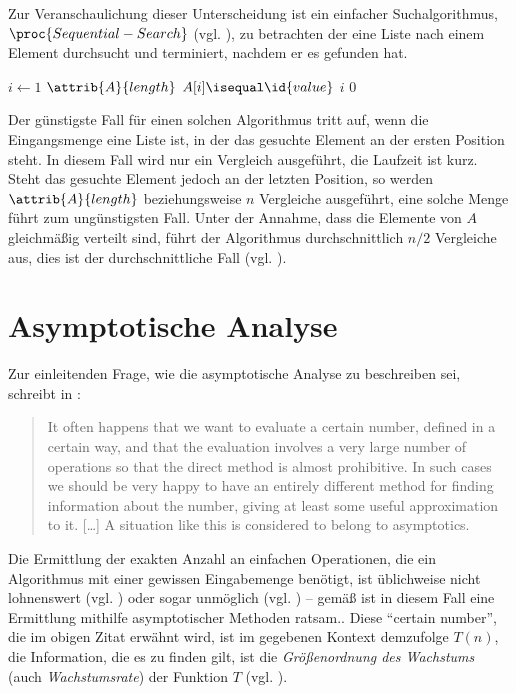 Zur Veranschaulichung dieser Unterscheidung ist ein einfacher Suchalgorithmus, $\proc{Sequential-Search}$ (vgl. \cite[396]{taocp3}), zu betrachten der eine Liste nach einem Element durchsucht und terminiert, nachdem er es gefunden hat.

\begin{codebox}
    \li \For $i \gets 1$ \To $\attrib{A}{length}$
    \li     \Do
                \If $A[i] \isequal \id{value}$
    \li             \Then
                        \Return $i$
                    \End
            \End
    \li \Return $0$
\end{codebox}

Der günstigste Fall für einen solchen Algorithmus tritt auf, wenn die Eingangsmenge eine Liste ist, in der das gesuchte Element an der ersten Position steht. In diesem Fall wird nur ein Vergleich ausgeführt, die Laufzeit ist kurz. Steht das gesuchte Element jedoch an der letzten Position, so werden $\attrib{A}{length}$ beziehungsweise $n$ Vergleiche ausgeführt, eine solche Menge führt zum ungünstigsten Fall. Unter der Annahme, dass die Elemente von $A$ gleichmäßig verteilt sind, führt der Algorithmus durchschnittlich $n/2$ Vergleiche aus, dies ist der durchschnittliche Fall (vgl. \cite[59]{sha2011}).

\section{Asymptotische Analyse}
\label{sec:asymptotic-analysis}

Zur einleitenden Frage, wie die asymptotische Analyse zu beschreiben sei, schreibt \citeauthor{bru1958} in :

\blockquote[{\cite[1]{bru1958}}]{It often happens that we want to evaluate a certain number, defined in a certain way, and that the evaluation involves a very large number of operations so that the direct method is almost prohibitive. In such cases we should be very happy to have an entirely different method for finding information about the number, giving at least some useful approximation to it. [\ldots] A situation like this is considered to belong to asymptotics.}

Die Ermittlung der exakten Anzahl an einfachen Operationen, die ein Algorithmus mit einer gewissen Eingabemenge benötigt, ist üblichweise nicht lohnenswert (vgl. \cite[28]{hsr1997}) oder sogar unmöglich (vgl. \cite[37]{meh1984}) -- gemäß \citeauthor{bru1958} ist in diesem Fall eine Ermittlung mithilfe asymptotischer Methoden ratsam.. Diese \enquote{certain number}, die im obigen Zitat erwähnt wird, ist im gegebenen Kontext demzufolge $T(n)$, die Information, die es zu finden gilt, ist die \emph{Größenordnung des Wachstums} (auch \emph{Wachstumsrate}) der Funktion $T$ (vgl. \cite[63]{sha2011}).

